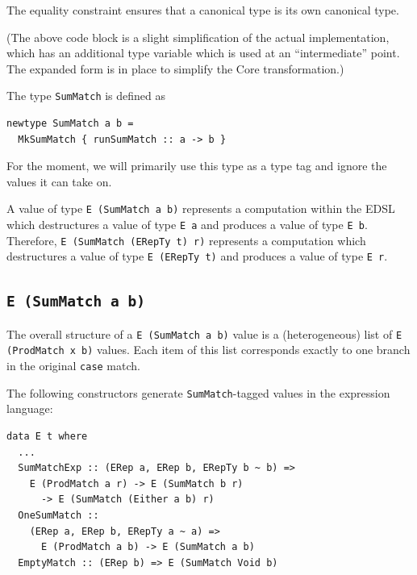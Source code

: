 \documentclass[runningheads, a4paper]{llncs}
\newcommand{\ttt}{\texttt}
\newenvironment{todo}
  {\ifthenelse{\isundefined{\showtodos}}{\comment}{\begin{tcolorbox}
    \textbf{TODO}:}}
  {\ifthenelse{\isundefined{\showtodos}}{\endcomment}{\end{tcolorbox}}
  }
\begin{document}
The equality constraint ensures that a canonical type is its own canonical type.


(The above code block is a slight simplification of the actual implementation,
which has an additional type variable which is used at an ``intermediate'' point.
The expanded form is in place to simplify the Core transformation.)

The type \ttt{SumMatch} is defined as

\begin{lstlisting}
newtype SumMatch a b =
  MkSumMatch { runSumMatch :: a -> b }
\end{lstlisting}

For the moment, we will primarily use this type as a type tag and ignore
the values it can take on.

A value of type \ttt{E (SumMatch a b)} represents a computation within the EDSL
which destructures a value of type \ttt{E a} and produces a value of type \ttt{E b}.
Therefore, \ttt{E (SumMatch (ERepTy t) r)} represents a computation which destructures
a value of type \ttt{E (ERepTy t)} and produces a value of type \ttt{E r}.



\subsection{\ttt{E (SumMatch a b)}}

The overall structure of a \ttt{E (SumMatch a b)} value is a (heterogeneous)
list of \ttt{E (ProdMatch x b)} values.  Each item of this list corresponds
exactly to one branch in the original \ttt{case} match.

The following constructors generate \ttt{SumMatch}-tagged values in the
expression language:

\begin{lstlisting}
data E t where
  ...
  SumMatchExp :: (ERep a, ERep b, ERepTy b ~ b) =>
    E (ProdMatch a r) -> E (SumMatch b r)
      -> E (SumMatch (Either a b) r)
  OneSumMatch ::
    (ERep a, ERep b, ERepTy a ~ a) =>
      E (ProdMatch a b) -> E (SumMatch a b)
  EmptyMatch :: (ERep b) => E (SumMatch Void b)
\end{lstlisting}
\end{document}
